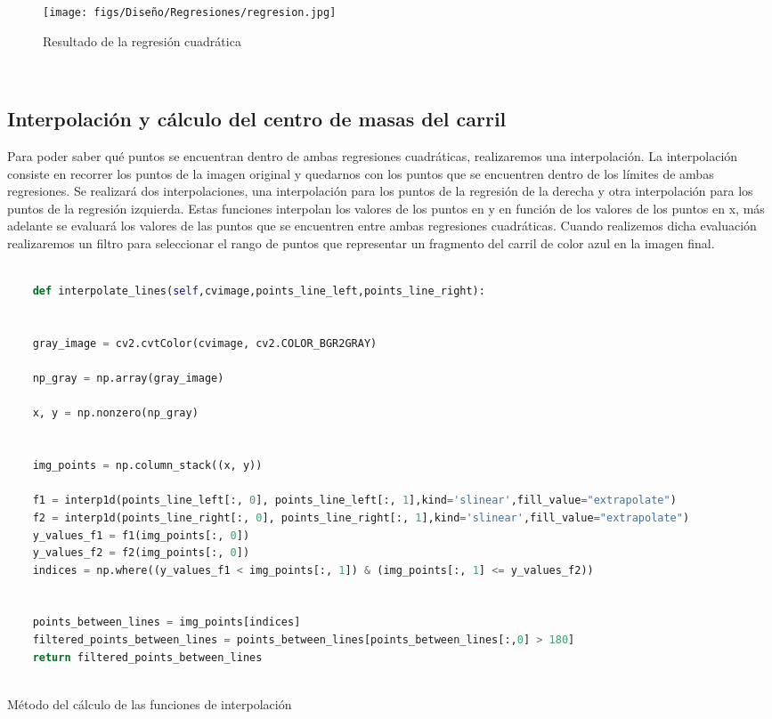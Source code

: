 \begin{figure} [H]
  \begin{center}
    \texttt{[image: figs/Diseño/Regresiones/regresion.jpg]}
  \end{center}
  \caption{Resultado de la regresión cuadrática}
  \label{fig:regresión cuadrática}
\end{figure}\

\subsection{Interpolación y cálculo del centro de masas del carril}
\label{sec:Interpolación y cálculo del centro de masas del carril}

Para poder saber qué puntos se encuentran dentro de ambas regresiones cuadráticas, realizaremos una interpolación. La interpolación consiste en recorrer
los puntos de la imagen original y quedarnos con los puntos que se encuentren dentro de los límites de ambas regresiones. Se realizará dos interpolaciones, una interpolación para 
los puntos de la regresión de la  derecha
y otra interpolación para los puntos de la regresión izquierda. Estas funciones interpolan los valores de los puntos en  y en función de los valores de los puntos en x, más adelante se evaluará los valores de las puntos que se encuentren entre 
ambas regresiones cuadráticas. Cuando realizemos dicha evaluación realizaremos un filtro para seleccionar el rango de puntos que representar un fragmento del carril de color azul en la imagen
final.\newline

\begin{code}[h]
  \begin{lstlisting}[language=Python]

    def interpolate_lines(self,cvimage,points_line_left,points_line_right):


    gray_image = cv2.cvtColor(cvimage, cv2.COLOR_BGR2GRAY) 

    np_gray = np.array(gray_image)

    x, y = np.nonzero(np_gray)


    img_points = np.column_stack((x, y))

    f1 = interp1d(points_line_left[:, 0], points_line_left[:, 1],kind='slinear',fill_value="extrapolate")
    f2 = interp1d(points_line_right[:, 0], points_line_right[:, 1],kind='slinear',fill_value="extrapolate") 
    y_values_f1 = f1(img_points[:, 0])
    y_values_f2 = f2(img_points[:, 0])
    indices = np.where((y_values_f1 < img_points[:, 1]) & (img_points[:, 1] <= y_values_f2))
    
    
    points_between_lines = img_points[indices]
    filtered_points_between_lines = points_between_lines[points_between_lines[:,0] > 180]
    return filtered_points_between_lines
    

  \end{lstlisting}
  \caption[Método de interpolación]{Método del cálculo de las funciones de interpolación}
  \label{cod:codejemplo}
  \end{code}  

